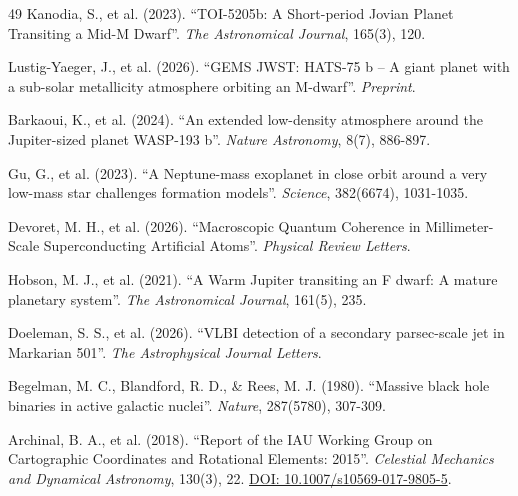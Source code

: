 \documentclass[11pt, a4paper]{article}
\newcommand{\doi}[1]{\href{https://doi.org/#1}{DOI: #1}}
\begin{document}
\begin{thebibliography}{49}
  Kanodia, S., et al. (2023). ``TOI-5205b: A Short-period Jovian Planet Transiting a Mid-M Dwarf''. \textit{The Astronomical Journal}, 165(3), 120.

  Lustig-Yaeger, J., et al. (2026). ``GEMS JWST: HATS-75 b -- A giant planet with a sub-solar metallicity atmosphere orbiting an M-dwarf''. \textit{Preprint}.

  Barkaoui, K., et al. (2024). ``An extended low-density atmosphere around the Jupiter-sized planet WASP-193 b''. \textit{Nature Astronomy}, 8(7), 886-897.

  Gu, G., et al. (2023). ``A Neptune-mass exoplanet in close orbit around a very low-mass star challenges formation models''. \textit{Science}, 382(6674), 1031-1035.

  Devoret, M. H., et al. (2026). ``Macroscopic Quantum Coherence in Millimeter-Scale Superconducting Artificial Atoms''. \textit{Physical Review Letters}.

  Hobson, M. J., et al. (2021). ``A Warm Jupiter transiting an F dwarf: A mature planetary system''. \textit{The Astronomical Journal}, 161(5), 235.

  Doeleman, S. S., et al. (2026). ``VLBI detection of a secondary parsec-scale jet in Markarian 501''. \textit{The Astrophysical Journal Letters}.

  Begelman, M. C., Blandford, R. D., \& Rees, M. J. (1980). ``Massive black hole binaries in active galactic nuclei''. \textit{Nature}, 287(5780), 307-309.

  Archinal, B. A., et al. (2018). ``Report of the IAU Working Group on Cartographic Coordinates and Rotational Elements: 2015''. \textit{Celestial Mechanics and Dynamical Astronomy}, 130(3), 22. 
  \doi{10.1007/s10569-017-9805-5}.

\end{thebibliography}
\end{document}
